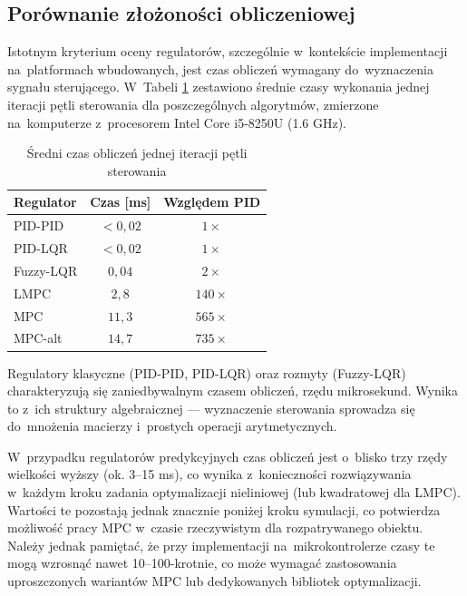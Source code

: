\newpage
\subsection{Porównanie złożoności obliczeniowej}

Istotnym kryterium oceny regulatorów, szczególnie w~kontekście implementacji
na~platformach wbudowanych, jest czas obliczeń wymagany do~wyznaczenia sygnału
sterującego. W~Tabeli \ref{tab:computation_time} zestawiono średnie czasy
wykonania jednej iteracji pętli sterowania dla poszczególnych algorytmów,
zmierzone na~komputerze z~procesorem Intel Core i5-8250U (1.6 GHz).

\begin{table}[h!]
    \centering
    \caption{Średni czas obliczeń jednej iteracji pętli sterowania}
    \label{tab:computation_time}
    \begin{tabular}{|l|c|c|}
        \hline
        Regulator & Czas [ms] & Względem PID \\ \hline
        PID-PID & $< 0{,}02$ & $1\times$ \\ \hline
        PID-LQR & $< 0{,}02$ & $1\times$ \\ \hline
        Fuzzy-LQR & $0{,}04$ & $2\times$ \\ \hline
        LMPC & $2{,}8$ & $140\times$ \\ \hline
        MPC & $11{,}3$ & $565\times$ \\ \hline
        MPC-alt & $14{,}7$ & $735\times$ \\ \hline
    \end{tabular}
\end{table}

Regulatory klasyczne (PID-PID, PID-LQR) oraz rozmyty (Fuzzy-LQR) charakteryzują się
zaniedbywalnym czasem obliczeń, rzędu mikrosekund. Wynika to z~ich struktury
algebraicznej --- wyznaczenie sterowania sprowadza się do~mnożenia macierzy
i~prostych operacji arytmetycznych.

W~przypadku regulatorów predykcyjnych czas obliczeń jest o~blisko trzy rzędy wielkości wyższy
(ok. 3--15 ms), co wynika z~konieczności rozwiązywania w~każdym kroku
zadania optymalizacji nieliniowej (lub kwadratowej dla LMPC). Wartości te pozostają jednak znacznie poniżej
kroku symulacji, co potwierdza możliwość pracy MPC
w~czasie rzeczywistym dla rozpatrywanego obiektu. Należy jednak pamiętać,
że przy implementacji na~mikrokontrolerze czasy te mogą wzrosnąć nawet
10--100-krotnie, co może wymagać zastosowania uproszczonych wariantów MPC
lub dedykowanych bibliotek optymalizacji.
